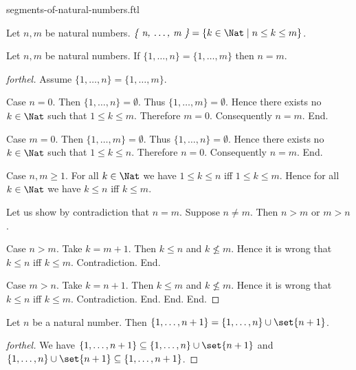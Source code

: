 \documentclass{naproche-library}
\begin{document}
\begin{smodule}[title=Segments of the Natural Numbers]{segments-of-natural-numbers.ftl}

\begin{definition}[forthel,id=FOUNDATIONS_14_3625613501923328]
  Let $n, m$ be natural numbers.
  $\emph{\{ n, \dots, m \}} = \{ k \in \Nat \mid n \leq k \leq m \}$.
\end{definition}

\begin{proposition}[forthel,id=FOUNDATIONS_14_145331933151232]
  Let $n, m$ be natural numbers.
  If $\{ 1, \dots, n \} = \{ 1, \dots, m \}$ then $n = m$.
\end{proposition}
\begin{proof}[forthel]
  Assume $\{ 1, \dots, n \} = \{ 1, \dots, m \}$.

  Case $n = 0$.
    Then $\{ 1, \dots, n \} = \emptyset$.
    Thus $\{ 1, \dots, m \} = \emptyset$.
    Hence there exists no $k \in \Nat$ such that $1 \leq k \leq m$.
    Therefore $m = 0$.
    Consequently $n = m$.
  End.

  Case $m = 0$.
    Then $\{ 1, \dots, m \} = \emptyset$.
    Thus $\{ 1, \dots, n \} = \emptyset$.
    Hence there exists no $k \in \Nat$ such that $1 \leq k \leq n$.
    Therefore $n = 0$.
    Consequently $n = m$.
  End.

  Case $n, m \geq 1$.
    For all $k \in \Nat$ we have $1 \leq k \leq n$ iff $1 \leq k \leq m$.
    Hence for all $k \in \Nat$ we have $k \leq n$ iff $k \leq m$.

    Let us show by contradiction that $n = m$.
      Suppose $n \neq m$.
      Then $n > m$ or $m > n$.

      Case $n > m$.
        Take $k = m + 1$.
        Then $k \leq n$ and $k \nleq m$.
        Hence it is wrong that $k \leq n$ iff $k \leq m$.
        Contradiction.
      End.

      Case $m > n$.
        Take $k = n + 1$.
        Then $k \leq m$ and $k \nleq m$.
        Hence it is wrong that $k \leq n$ iff $k \leq m$.
        Contradiction.
      End.
    End.
  End.
\end{proof}

\begin{proposition}[forthel,id=FOUNDATIONS_14_658708738605056]
  Let $n$ be a natural number.
  Then $\{ 1, \dots, n + 1 \} = \{ 1, \dots, n \} \cup \set{n + 1}$.
\end{proposition}
\begin{proof}[forthel]
  We have
  $\{ 1, \dots, n + 1 \} \subseteq \{ 1, \dots, n \} \cup \set{n + 1}$ and $\{ 1, \dots, n \} \cup \set{n + 1} \subseteq \{ 1, \dots, n + 1 \}$.
\end{proof}
\end{smodule}
\end{document}
